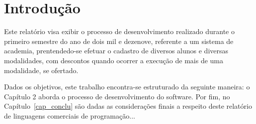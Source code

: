 \chapter{Introdução}\label{cap_intro}

Este relatório visa exibir o processo de desenvolvimento realizado durante o primeiro semestre do ano de dois mil e dezenove, referente a um sistema de academia, prentendedo-se efetuar o cadastro de diversos alunos e diversas modalidades, com descontos quando ocorrer a execução de mais de uma modalidade, se ofertado.

Dados os objetivos, este trabalho encontra-se estruturado da seguinte maneira: o Capítulo 2 aborda o processo de desenvolvimento do software. Por fim, no Capítulo~\ref{cap_conclu} são dadas as considerações finais a respeito deste relatório de linguagens comerciais de programação...
